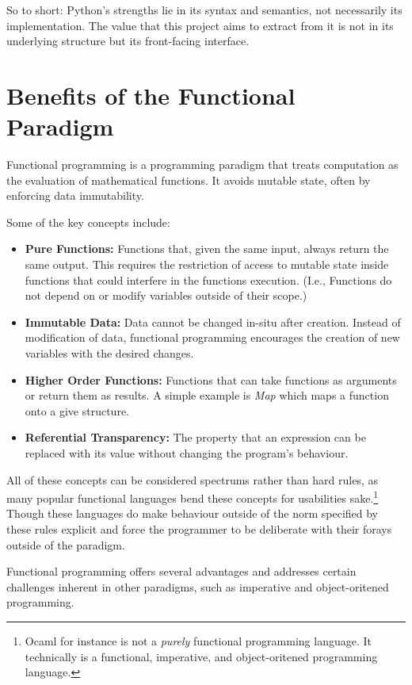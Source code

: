 \documentclass{l4proj}
\begin{document}
So to short: Python's strengths lie in its syntax and semantics, not necessarily its implementation.
The value that this project aims to extract from it is not in its underlying structure but its front-facing interface.

\section{Benefits of the Functional Paradigm}

Functional programming is a programming paradigm that treats computation as the evaluation of mathematical functions.
It avoids mutable state, often by enforcing data immutability.

Some of the key concepts include:

\begin{itemize}
    \item \textbf{Pure Functions:} Functions that, given the same input, always return the same output.
    This requires the restriction of access to mutable state inside functions that could interfere in the functions execution.
    (I.e., Functions do not depend on or modify variables outside of their scope.)
    \item \textbf{Immutable Data:} Data cannot be changed in-situ after creation.
    Instead of modification of data, functional programming encourages the creation of new variables with the desired changes.
    \item \textbf{Higher Order Functions:} Functions that can take functions as arguments or return them as results.
    A simple example is \emph{Map} which maps a function onto a give structure.
    \item \textbf{Referential Transparency:} The property that an expression can be replaced with its value without changing the program's behaviour. 
\end{itemize}

All of these concepts can be considered spectrums rather than hard rules, as many popular functional languages bend these concepts for usabilities sake.\footnote{Ocaml for instance is not a \emph{purely} functional programming language. It technically is a functional, imperative, and object-oritened programming language.}
Though these languages do make behaviour outside of the norm specified by these rules explicit and force the programmer to be deliberate with their forays outside of the paradigm.

Functional programming offers several advantages and addresses certain challenges inherent in other paradigms, such as imperative and object-oritened programming. 
\end{document}
